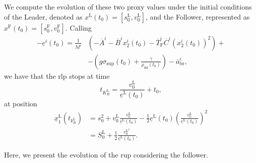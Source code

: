 We compute the evolution of these two proxy values under the initial conditions of the Leader, denoted as $x^\mathrm{L}\left(t_0\right)=\left[s_0^\mathrm{L},v_0^\mathrm{L}\right]$, and the Follower, represented as $x^\mathrm{F}\left(t_0\right)=\left[s_0^\mathrm{F},v_0^\mathrm{F}\right]$. Calling
%
\begin{equation*}
	\begin{aligned}
		-\underline{e}^i\left(t_0\right)=\frac{1}{\underline{M}^i} & \left(-\overline{A}^i-\overline{B}^i x_2^i\left(t_0\right)-\overline{T}_\mathrm{F}^i \overline{C}^{i}\left(x_2^i\left(t_0\right)\right)^2\right)+ \\
		& -\left( g \sigma_{\sup}\left(t_0\right)+ \frac{\gamma}{\rho_{\inf}\left(t_0\right)} \right)-\overline{a}^i_\mathrm{br},
	\end{aligned}
\end{equation*}
%
we have that the \gls{rlp} stops at time
%
\begin{equation*}
	t_{K_B^\mathrm{L}} = \frac{v_0^\mathrm{L}}{\underline{e}^\mathrm{L}\left(t_0\right)} + t_0,
\end{equation*}
%
at position
%
\begin{equation*}
	\begin{aligned}
		\underline{x}_1^\mathrm{L}\left(t_{k_B^\mathrm{L}}\right) & =s_0^2+v_0^\mathrm{L} \frac{v_0^\mathrm{L}}{\underline{e}^\mathrm{L}\left(t_0\right)}-\frac{1}{2} \underline{e}^\mathrm{L}\left(t_0\right)  \left(\frac{v_0^\mathrm{L}}{\underline{e}^\mathrm{L}\left(t_0\right)}\right)^2 \\
		& =S_0^\mathrm{L}+\frac{1}{2} \frac{v_0^{\mathrm{L}^2}}{\underline{e}^\mathrm{L}\left(t_0\right)}.
	\end{aligned}
\end{equation*}

Here, we present the evolution of the \gls{rup} considering the follower.

